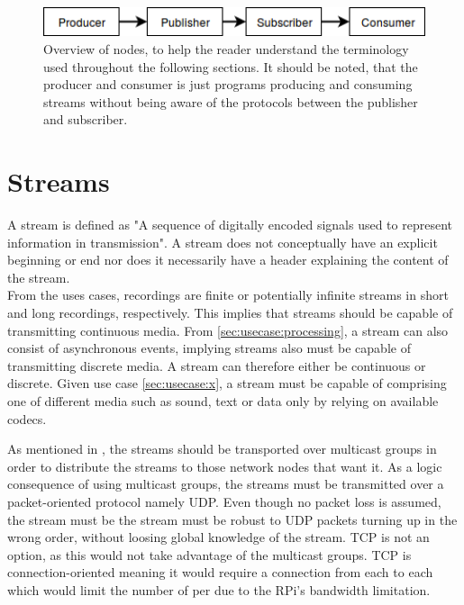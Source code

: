\begin{figure}[h!]
	\includegraphics[width=1\textwidth]{figures/analysis-terminilogy-overview.png}
	\caption{Overview of nodes, to help the reader understand the terminology used throughout the following sections. It should be noted, that the producer and consumer is just programs producing and consuming streams without being aware of the protocols between the publisher and subscriber.} \label{fig:analysis:terminology}
\end{figure} 




\section{Streams} \label{sec:analysis:streams}
A stream is defined as "A sequence of digitally encoded signals used to represent information in transmission"\citep{data_stream_2018}. A stream does not conceptually have an explicit beginning or end nor does it necessarily have a header explaining the content of the stream.\\
From the uses cases, recordings are finite or potentially infinite streams in short and long recordings, respectively. This implies that streams should be capable of transmitting   continuous media. From \ref{sec:usecase:processing}, a stream can also consist of asynchronous events, implying streams also must be capable of transmitting discrete media. 
A stream can therefore either be continuous or discrete. 
Given use case \ref{sec:usecase:x}, a stream must be capable of comprising one of different media such as sound, text or data only by relying on available codecs. 

As mentioned in , the streams should be transported over multicast groups in order to distribute the streams to those network nodes that want it. 
As a logic consequence of using multicast groups, the streams must be transmitted over a  packet-oriented protocol namely UDP. Even though no packet loss is assumed, the stream must be the stream must be robust to UDP packets turning up in the wrong order, without loosing global knowledge of the stream. TCP is not an option, as this would not take advantage of the multicast groups. TCP is connection-oriented meaning it would require a connection from each  to each  which would limit the number of  per  due to the RPi's bandwidth limitation.
 
